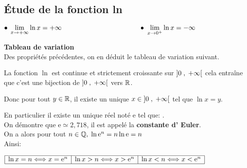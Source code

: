 \subsection{ Étude de la fonction ln }

 \begin{property}[Limites]
 $ \bullet \; \displaystyle\lim_{x \to \pinf}\ln x=\pinf  \hspace*{4cm}    \bullet  \; \displaystyle\lim_{x \to 0^{+}}\ln x=\minf $
  \end{property}
  

\textbf{Tableau de variation }\\
Des propriétés précédentes, on en déduit  le tableau de variation suivant.

\begin{center}


\end{center}
\begin{corollary}
La fonction $ \ln  $  est continue et strictement croissante sur $ \left]0 \;,\; +\infty\right[ $  cela entraîne que c'est une bijection de $ \left]0 \;,\; +\infty\right[ $  vers $ \mathbb{R} $.

Donc  pour tout  $  y \in \mathbb{R} $, \; il existe un unique $ x\in \left]0 \;,\; +\infty\right[ $ tel que $ \ln x=y. $ 

 En particulier il existe un unique réel noté $ \mathrm{e} $ tel que: \quad {}.\\

On démontre que $ \mathrm{e}\simeq 2,718 $,    il  est appelé la   {\bf  constante d' Euler}.\\

On a alors  pour tout $  n \in \mathbb{Q}, \; \ln \mathrm{e}^{n}=n\ln \mathrm{e}=n $\\


Ainsi:
\medskip

$\begin{array}{ |l|c|r|}
\hline
 \ln x = n  \Longleftrightarrow x = \mathrm{e}^{n} &
 \ln x  > n \Longleftrightarrow x   >\mathrm{e}^{n} &
 \ln x  < n\Longleftrightarrow x <   \mathrm{e}^{n} \\
\hline
\end{array}$

\end{corollary}
